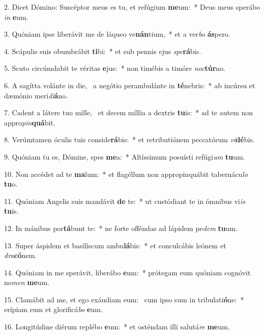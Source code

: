 2. Dicet Dómino: Suscéptor meus es tu, et refúgium \textbf{me}um:~*  Deus meus sperábo \textit{in} \textbf{e}um.\

3. Quóniam ipse liberávit me de láqueo ve\textbf{nán}tium,~*  et a ver\textit{bo} \textbf{ás}pero.\

4. Scápulis suis obumbrábit \textbf{ti}bi:~*  et sub pennis ejus \textit{spe}\textbf{rá}bis.\

5. Scuto circúmdabit te véritas \textbf{e}jus:~*  non timébis a timóre \textit{noc}\textbf{túr}no.\

6. A sagítta volánte in die, \dag\  a negótio perambulánte in \textbf{té}nebris:~*  ab incúrsu et dæmónio meri\textit{di}\textbf{á}no.\

7. Cadent a látere tuo mille, \dag\  et decem míllia a dextris \textbf{tu}is:~*  ad te autem non appro\textit{pin}\textbf{quá}bit.\

8. Verúmtamen óculis tuis conside\textbf{rá}bis:~*  et retributiónem peccatórum \textit{vi}\textbf{dé}bis.\

9. Quóniam tu es, Dómine, spes \textbf{me}a:~*  Altíssimum posuísti refúgi\textit{um} \textbf{tu}um.\

10. Non accédet ad te \textbf{ma}lum:~*  et flagéllum non appropinquábit tabernácu\textit{lo} \textbf{tu}o.\

11. Quóniam Angelis suis mandávit \textbf{de} te:~*  ut custódiant te in ómnibus vi\textit{is} \textbf{tu}is.\

12. In mánibus por\textbf{tá}bunt te:~*  ne forte offéndas ad lápidem pe\textit{dem} \textbf{tu}um.\

13. Super áspidem et basilíscum ambu\textbf{lá}bis:~*  et conculcábis leónem et \textit{dra}\textbf{có}nem.\

14. Quóniam in me sperávit, liberábo \textbf{e}um:~*  prótegam eum quóniam cognóvit no\textit{men} \textbf{me}um.\

15. Clamábit ad me, et ego exáudiam eum: \dag\  cum ipso sum in tribulati\textbf{ó}ne:~*  erípiam eum et glorificá\textit{bo} \textbf{e}um.\

16. Longitúdine diérum replébo \textbf{e}um:~*  et osténdam illi salutá\textit{re} \textbf{me}um.\

